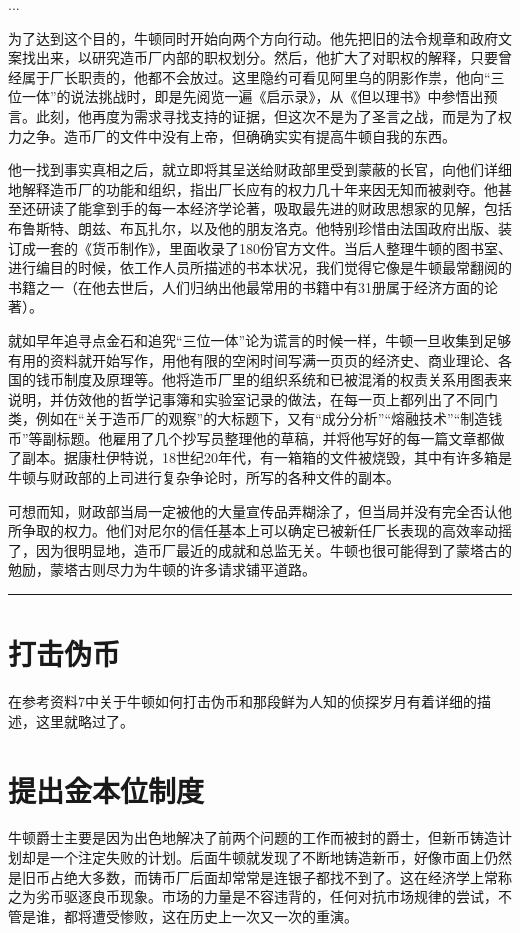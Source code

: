 \documentclass[12pt,oneside]{book}
\newcommand\hr{\par\noindent\hrule}
\begin{document}
...

为了达到这个目的，牛顿同时开始向两个方向行动。他先把旧的法令规章和政府文案找出来，以研究造币厂内部的职权划分。然后，他扩大了对职权的解释，只要曾经属于厂长职责的，他都不会放过。这里隐约可看见阿里乌的阴影作祟，他向“三位一体”的说法挑战时，即是先阅览一遍《启示录》，从《但以理书》中参悟出预言。此刻，他再度为需求寻找支持的证据，但这次不是为了圣言之战，而是为了权力之争。造币厂的文件中没有上帝，但确确实实有提高牛顿自我的东西。

他一找到事实真相之后，就立即将其呈送给财政部里受到蒙蔽的长官，向他们详细地解释造币厂的功能和组织，指出厂长应有的权力几十年来因无知而被剥夺。他甚至还研读了能拿到手的每一本经济学论著，吸取最先进的财政思想家的见解，包括布鲁斯特、朗兹、布瓦扎尔，以及他的朋友洛克。他特别珍惜由法国政府出版、装订成一套的《货币制作》，里面收录了180份官方文件。当后人整理牛顿的图书室、进行编目的时候，依工作人员所描述的书本状况，我们觉得它像是牛顿最常翻阅的书籍之一（在他去世后，人们归纳出他最常用的书籍中有31册属于经济方面的论著）。

就如早年追寻点金石和追究“三位一体”论为谎言的时候一样，牛顿一旦收集到足够有用的资料就开始写作，用他有限的空闲时间写满一页页的经济史、商业理论、各国的钱币制度及原理等。他将造币厂里的组织系统和已被混淆的权责关系用图表来说明，并仿效他的哲学记事簿和实验室记录的做法，在每一页上都列出了不同门类，例如在“关于造币厂的观察”的大标题下，又有“成分分析”“熔融技术”“制造钱币”等副标题。他雇用了几个抄写员整理他的草稿，并将他写好的每一篇文章都做了副本。据康杜伊特说，18世纪20年代，有一箱箱的文件被烧毁，其中有许多箱是牛顿与财政部的上司进行复杂争论时，所写的各种文件的副本。

可想而知，财政部当局一定被他的大量宣传品弄糊涂了，但当局并没有完全否认他所争取的权力。他们对尼尔的信任基本上可以确定已被新任厂长表现的高效率动摇了，因为很明显地，造币厂最近的成就和总监无关。牛顿也很可能得到了蒙塔古的勉励，蒙塔古则尽力为牛顿的许多请求铺平道路。

\hr 


\section{打击伪币}
在参考资料7中关于牛顿如何打击伪币和那段鲜为人知的侦探岁月有着详细的描述，这里就略过了。


\section{提出金本位制度}
牛顿爵士主要是因为出色地解决了前两个问题的工作而被封的爵士，但新币铸造计划却是一个注定失败的计划。后面牛顿就发现了不断地铸造新币，好像市面上仍然是旧币占绝大多数，而铸币厂后面却常常是连银子都找不到了。这在经济学上常称之为劣币驱逐良币现象。市场的力量是不容违背的，任何对抗市场规律的尝试，不管是谁，都将遭受惨败，这在历史上一次又一次的重演。
\end{document}
